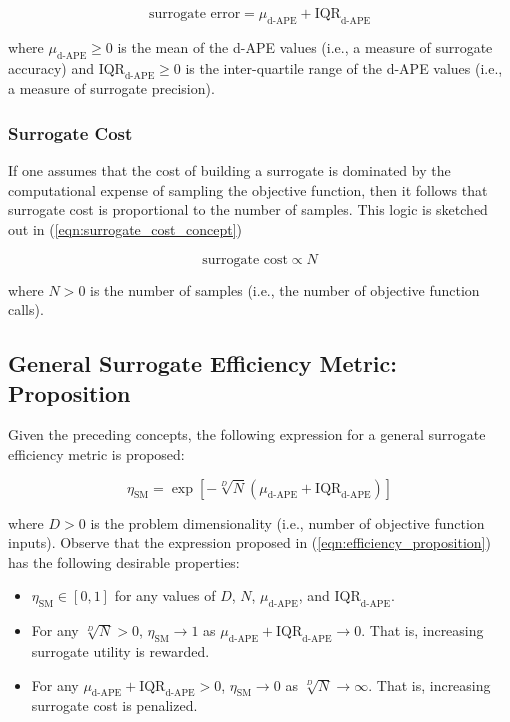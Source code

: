 \documentclass[conference]{IEEEtran}
\begin{document}
\begin{equation}
	\textrm{surrogate error} = \mu_\textrm{d-APE} + \text{IQR}_\textrm{d-APE}
	\label{eqn:surrogate_error}
\end{equation}

\noindent where $\mu_\textrm{d-APE} \geq 0$ is the mean of the d-APE values (i.e., a measure of surrogate accuracy) and $\text{IQR}_\textrm{d-APE} \geq 0$ is the inter-quartile range of the d-APE values (i.e., a measure of surrogate precision).

\subsubsection{Surrogate Cost}

If one assumes that the cost of building a surrogate is dominated by the computational expense of sampling the objective function, then it follows that surrogate cost is proportional to the number of samples. This logic is sketched out in (\ref{eqn:surrogate_cost_concept})

\begin{equation}
	\textrm{surrogate cost} \propto N
	\label{eqn:surrogate_cost_concept}
\end{equation}

\noindent where $N > 0$ is the number of samples (i.e., the number of objective function calls).

\subsection{General Surrogate Efficiency Metric: Proposition}

Given the preceding concepts, the following expression for a general surrogate efficiency metric is proposed:

\begin{equation}
	\eta_\textrm{SM} = \exp\left[-\sqrt[D]{N}(\mu_\textrm{d-APE} + \textrm{IQR}_\textrm{d-APE})\right]
	\label{eqn:efficiency_proposition}
\end{equation}

\noindent where $D>0$ is the problem dimensionality (i.e., number of objective function inputs). Observe that the expression proposed in (\ref{eqn:efficiency_proposition}) has the following desirable properties:

\begin{itemize}
	\item $\eta_\textrm{SM} \in [0,1]$ for any values of $D$, $N$, $\mu_\textrm{d-APE}$, and $\textrm{IQR}_\textrm{d-APE}$.
	\item For any $\sqrt[D]{N} > 0$, $\eta_\textrm{SM} \to 1$ as $\mu_\textrm{d-APE} + \textrm{IQR}_\textrm{d-APE} \to 0$. That is, increasing surrogate utility is rewarded.
	\item For any $\mu_\textrm{d-APE} + \textrm{IQR}_\textrm{d-APE} > 0$, $\eta_\textrm{SM} \to 0$ as $\sqrt[D]{N} \to \infty$. That is, increasing surrogate cost is penalized.
\end{itemize}
\end{document}
